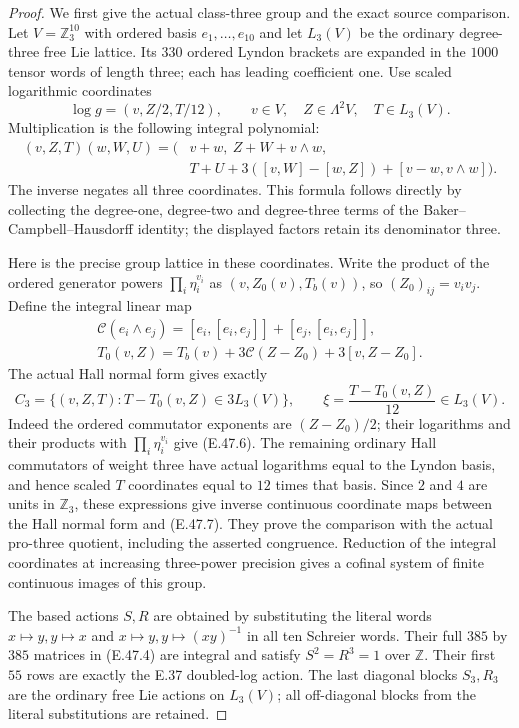 \begin{proof}
We first give the actual class-three group and
the exact source comparison.  Let $V=\mathbb Z_3^{10}$
with ordered basis $e_1,\ldots,e_{10}$ and let
$L_3(V)$ be the ordinary degree-three free Lie
lattice.  Its $330$ ordered Lyndon brackets are
expanded in the $1000$ tensor words of length
three; each has leading coefficient one.
Use scaled logarithmic coordinates
\[
 \log g=(v,Z/2,T/12),\qquad
 v\in V,\quad Z\in\Lambda^2V,\quad T\in L_3(V).
 \tag{E.47.4}
\]
Multiplication is the following integral polynomial:
\[
 \begin{split}
 (v,Z,T)(w,W,U)=\bigl(&v+w,\ Z+W+v\wedge w,\\
 &T+U+3([v,W]-[w,Z])+[v-w,v\wedge w]\bigr).
 \end{split}
 \tag{E.47.5}
\]
The inverse negates all three coordinates.
This formula follows directly by collecting the
degree-one, degree-two and degree-three terms of
the Baker--Campbell--Hausdorff identity; the
displayed factors retain its denominator three.

Here is the precise group lattice in these
coordinates.  Write the product of the ordered
generator powers $\prod_i\eta_i^{v_i}$ as
$(v,Z_0(v),T_b(v))$, so $(Z_0)_{ij}=v_iv_j$.
Define the integral linear map
\[
 \begin{gathered}
 \mathcal C(e_i\wedge e_j)
 =[e_i,[e_i,e_j]]+[e_j,[e_i,e_j]],
 \\
 T_0(v,Z)=T_b(v)+3\mathcal C(Z-Z_0)+3[v,Z-Z_0].
 \end{gathered}
 \tag{E.47.6}
\]
The actual Hall normal form gives exactly
\[
 C_3=\{(v,Z,T):T-T_0(v,Z)\in3L_3(V)\},
 \qquad
 \xi=\frac{T-T_0(v,Z)}{12}\in L_3(V).
 \tag{E.47.7}
\]
Indeed the ordered commutator exponents are
$(Z-Z_0)/2$; their logarithms and their products
with $\prod_i\eta_i^{v_i}$ give
\textup{(E.47.6)}.  The remaining ordinary Hall
commutators of weight three have actual logarithms
equal to the Lyndon basis, and hence scaled $T$
coordinates equal to $12$ times that basis.
Since $2$ and $4$
are units in $\mathbb Z_3$, these expressions
give inverse continuous coordinate maps between
the Hall normal form and \textup{(E.47.7)}.
They prove the comparison with the actual pro-three
quotient, including the asserted congruence.
Reduction of the integral coordinates at increasing
three-power precision gives a cofinal system of
finite continuous images of this group.

The based actions $S,R$ are obtained by substituting
the literal words
$x\mapsto y,y\mapsto x$ and
$x\mapsto y,y\mapsto(xy)^{-1}$ in all ten
Schreier words.  Their full $385$ by $385$ matrices
in \textup{(E.47.4)} are integral and satisfy
$S^2=R^3=1$ over $\mathbb Z$.
Their first $55$ rows are exactly the E.37
doubled-log action.  The last diagonal blocks
$S_3,R_3$ are the ordinary free Lie actions on
$L_3(V)$; all off-diagonal blocks from the
literal substitutions are retained.


\end{proof}
